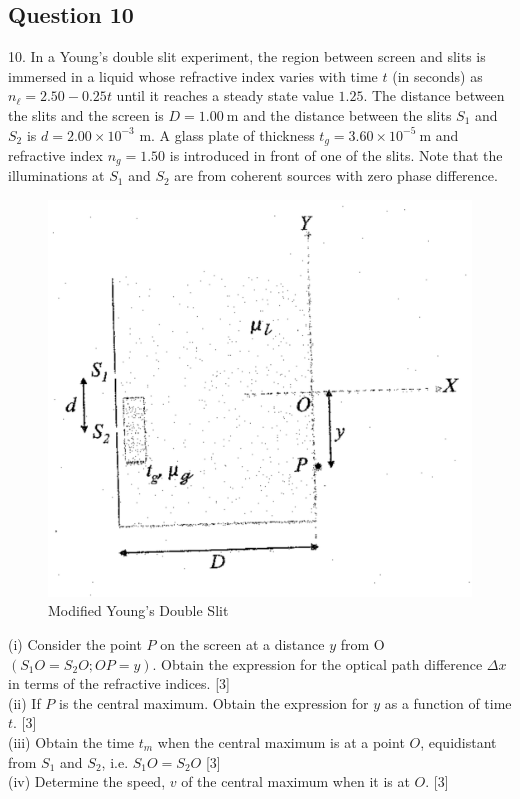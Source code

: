 \documentclass{article}
\begin{document}
\subsection{Question 10}
10. In a Young's double slit experiment, the region between screen and slits is immersed in a liquid whose refractive index varies with time $t$ (in seconds) as $n_{\ell}=2.50 - 0.25 t$ until it reaches a steady state value $1.25$. The distance between the slits and the screen is $D=1.00 \mathrm{~m}$ and the distance between the slits $S_{1}$ and $S_{2}$ is $d=2.00 \times 10^{-3}$ m. A glass plate of thickness $t_{g}=3.60 \times 10^{-5} \mathrm{~m}$ and refractive index $n_{g}=1.50$ is introduced in front of one of the slits. Note that the illuminations at $S_{1}$ and $S_{2}$ are from coherent sources with zero phase difference.

\begin{figure}
	\centering
	\includegraphics[width=0.5\linewidth]{spho_book_TYS_images/2012q10.png}
	\caption{Modified Young's Double Slit}
\end{figure}

(i) Consider the point $P$ on the screen at a distance $y$ from O $(S_{1} O=S_{2} O ; O P=y)$. Obtain the expression for the optical path difference $\Delta x$ in terms of the refractive indices. [3] \\
(ii) If $P$ is the central maximum. Obtain the expression for $y$ as a function of time $t$. [3] \\
(iii) Obtain the time $t_{m}$ when the central maximum is at a point $O$, equidistant from $S_{1}$ and $S_{2}$, i.e. $S_{1} O=S_{2} O$ [3] \\
(iv) Determine the speed, $v$ of the central maximum when it is at $O$. [3]
\end{document}
